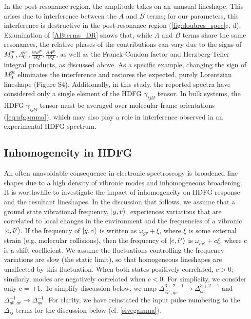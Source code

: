 \documentclass[aip, jcp, reprint, onecolumn, nofootinbib]{revtex4-2}
\begin{document}
In the post-resonance region, the amplitude takes on an unusual lineshape.
This arises due to interference between the $A$ and $B$ terms; for our parameters, this interference is destructive in the post-resonance region (\autoref{fig:doubres_spec}c, d).
Examination of \autoref{ABterms_DR} shows that, while $A$ and $B$ terms share the same resonances, the relative phases of the contributions can vary due to the signs of $M^{ge}_0, \Lambda^{ge}_0, \frac{\partial M^{ge}}{\partial Q} , \frac{\partial \Lambda^{ge}}{\partial Q}$, as well as the Franck-Condon factor and Herzberg-Teller integral products, as discussed above. 
As a specific example, changing the sign of $M^{ge}_0$ eliminates the interference and restores the expected, purely Lorentzian lineshape (Figure S4).
Additionally, in this study, the reported spectra have considered only a single element of the HDFG $\gamma_{ijkl}$ tensor.
In bulk systems, the HDFG $\gamma_{ijkl}$ tensor must be averaged over molecular frame orientations (\autoref{eq:nfgamma}), which may also play a role in interference observed in an experimental HDFG spectrum.

\subsection{Inhomogeneity in HDFG}

An often unavoidable consequence in electronic spectroscopy is broadened line shapes due to a high density of vibronic modes and inhomogeneous broadening.
It is worthwhile to investigate the impact of inhomogeneity on HDFG response and the resultant lineshapes. 
In the discussion that follows, we assume that a ground state vibrational frequency, $\ket{g,v}$, experiences variations that are correlated to local changes in the environment and the frequencies of a vibronic $\ket{e,\tilde{v}'}$.
If the frequency of $\ket{g,v}$ is written as $\omega_{gv} + \xi$, where $\xi$ is some external strain (e.g. molecular collisions), then the frequency of $\ket{e,\tilde{v}'}$ is $\omega_{e\tilde{v}'} + c\xi$, where c is a shift coefficient.
We assume the fluctuations controlling the frequency variations are slow (the static limit), so that homogeneous lineshapes are unaffected by this fluctuation. 
When both states positively correlated, $c > 0$; similarly, modes are negatively correlated when $c < 0$.
For simplicity, we consider only c = $\pm$1.
To simplify discussion below, we map $\Delta^{3+2-1}_{e\tilde{v}', gv} \rightarrow \Delta^{3+2-1}_{ba}$ and $\Delta^{-1}_{g0,gv} \rightarrow \Delta^{-1}_{ga}$.
For clarity, we have reinstated the input pulse numbering to the $\Delta_{ij}$ terms for the discussion below (cf. \autoref{sivegamma}).
\end{document}
